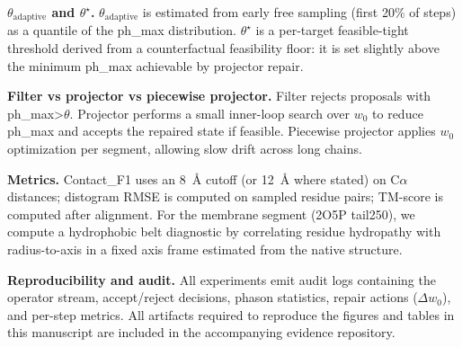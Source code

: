 \textbf{$\theta_{\mathrm{adaptive}}$ and $\theta^\star$.} $\theta_{\mathrm{adaptive}}$ is estimated from early free sampling (first 20\% of steps) as a quantile of the ph\_max distribution. $\theta^\star$ is a per-target feasible-tight threshold derived from a counterfactual feasibility floor: it is set slightly above the minimum ph\_max achievable by projector repair.

\textbf{Filter vs projector vs piecewise projector.} Filter rejects proposals with ph\_max>$\theta$. Projector performs a small inner-loop search over $w_0$ to reduce ph\_max and accepts the repaired state if feasible. Piecewise projector applies $w_0$ optimization per segment, allowing slow drift across long chains.

\textbf{Metrics.} Contact\_F1 uses an 8~\AA{} cutoff (or 12~\AA{} where stated) on C$\alpha$ distances; distogram RMSE is computed on sampled residue pairs; TM-score is computed after alignment. For the membrane segment (2O5P tail250), we compute a hydrophobic belt diagnostic by correlating residue hydropathy with radius-to-axis in a fixed axis frame estimated from the native structure.

\textbf{Reproducibility and audit.} All experiments emit audit logs containing the operator stream, accept/reject decisions, phason statistics, repair actions ($\Delta w_0$), and per-step metrics. All artifacts required to reproduce the figures and tables in this manuscript are included in the accompanying evidence repository.
